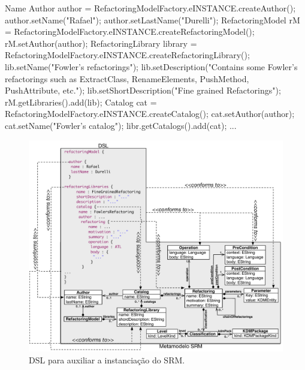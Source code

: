 \begin{codigo}[caption={[Instanciação do metamodelo SRM programaticamente.] Instanciação do metamodelo SRM.},escapeinside={(*@}{@*)}, basicstyle=\footnotesize, label={cod:instancia_do_SRM}, language=Java]{Name}
Author author = RefactoringModelFactory.eINSTANCE.createAuthor();
author.setName("Rafael");
author.setLastName("Durelli");
RefactoringModel rM = RefactoringModelFactory.eINSTANCE.createRefactoringModel();
rM.setAuthor(author);
RefactoringLibrary library = RefactoringModelFactory.eINSTANCE.createRefactoringLibrary();
lib.setName("Fowler's refactorings");
lib.setDescription("Contains some Fowler's refactorings such as ExtractClass, RenameElements, PushMethod, PushAttribute, etc.");
lib.setShortDescription("Fine grained Refactorings");
rM.getLibraries().add(lib);
Catalog cat = RefactoringModelFactory.eINSTANCE.createCatalog();
cat.setAuthor(author);
cat.setName("Fowler's catalog");
libr.getCatalogs().add(cat);
...
\end{codigo}

\begin{figure}[!h]
	\centering
	\caption{DSL para auxiliar a instanciação do SRM.}
	\label{fig:DSL_SRM}
	\includegraphics[scale=0.6]{images/MetaModelEDSL}
	\fautor
\end{figure}




